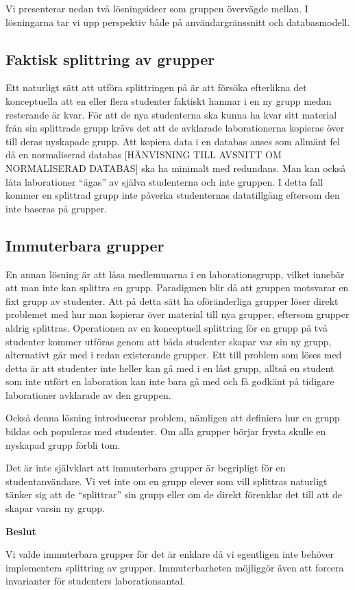 Vi presenterar nedan två lösningsideer som gruppen övervägde mellan. I lösningarna tar vi upp perspektiv både på användargränssnitt och databasmodell.

\subsection{Faktisk splittring av grupper}
Ett naturligt sätt att utföra splittringen på är att försöka efterlikna det konceptuella att en eller flera studenter faktiskt hamnar i en ny grupp medan resterande är kvar. För att de nya studenterna ska kunna ha kvar sitt material från sin splittrade grupp krävs det att de avklarade laborationerna kopieras över till deras nyskapade grupp. Att kopiera data i en databas anses som allmänt fel då en normaliserad databas [HÄNVISNING TILL AVSNITT OM NORMALISERAD DATABAS] ska ha minimalt med redundans. Man kan också låta laborationer “ägas” av själva studenterna och inte gruppen. I detta fall kommer en splittrad grupp inte påverka studenternas datatillgång eftersom den inte baseras på grupper.

\subsection{Immuterbara grupper}
En annan lösning är att låsa medlemmarna i en laborationsgrupp, vilket innebär att man inte kan splittra en grupp. Paradigmen blir då att gruppen motsvarar en fixt grupp av studenter. Att på detta sätt ha oföränderliga grupper löser direkt problemet med hur man kopierar över material till nya grupper, eftersom grupper aldrig splittras. Operationen av en konceptuell splittring för en grupp på två studenter kommer utföras genom att båda studenter skapar var sin ny grupp, alternativt går med i redan existerande grupper. Ett till problem som löses med detta är att studenter inte heller kan gå med i en låst grupp, alltså en student som inte utfört en laboration kan inte bara gå med och få godkänt på tidigare laborationer avklarade av den gruppen.

Också denna lösning introducerar problem, nämligen att definiera hur en grupp bildas och populeras med studenter. Om alla grupper börjar frysta skulle en nyskapad grupp förbli tom.

Det är inte självklart att immuterbara grupper är begripligt för en studentanvändare.  Vi vet inte om en grupp elever som vill splittras naturligt tänker sig att de “splittrar” sin grupp eller om de direkt förenklar det till att de skapar varsin ny grupp.

\begin{flushright}

  \textbf{Beslut}

  Vi valde immuterbara grupper för det är enklare då vi egentligen inte behöver implementera splittring av grupper. Immuterbarheten möjliggör även att forcera invarianter för studenters laborationsantal.
\end{flushright}

